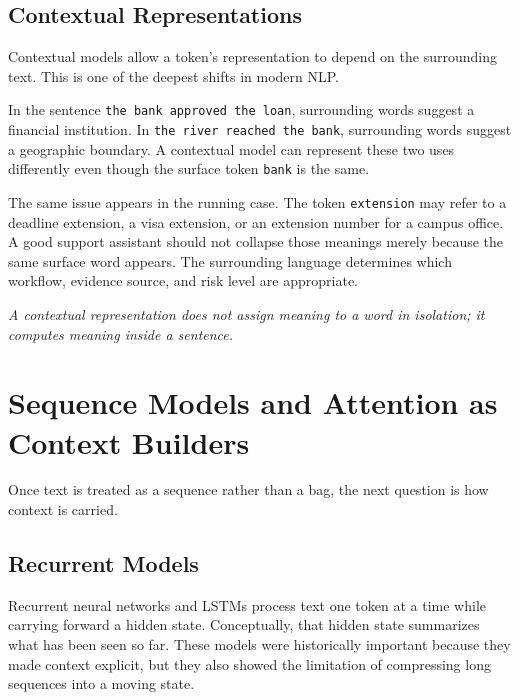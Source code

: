 \subsection{Contextual Representations}

Contextual models allow a token's representation to depend on the surrounding text. This is one of the deepest shifts in modern NLP.

\begin{example}
In the sentence \texttt{the bank approved the loan}, surrounding words suggest a financial institution. In \texttt{the river reached the bank}, surrounding words suggest a geographic boundary. A contextual model can represent these two uses differently even though the surface token \texttt{bank} is the same.
\end{example}

The same issue appears in the running case. The token \texttt{extension} may refer to a deadline extension, a visa extension, or an extension number for a campus office. A good support assistant should not collapse those meanings merely because the same surface word appears. The surrounding language determines which workflow, evidence source, and risk level are appropriate.

\begin{center}
\emph{A contextual representation does not assign meaning to a word in isolation; it computes meaning inside a sentence.}
\end{center}

\section{Sequence Models and Attention as Context Builders}

Once text is treated as a sequence rather than a bag, the next question is how context is carried.

\subsection{Recurrent Models}

Recurrent neural networks and LSTMs process text one token at a time while carrying forward a hidden state. Conceptually, that hidden state summarizes what has been seen so far. These models were historically important because they made context explicit, but they also showed the limitation of compressing long sequences into a moving state.

